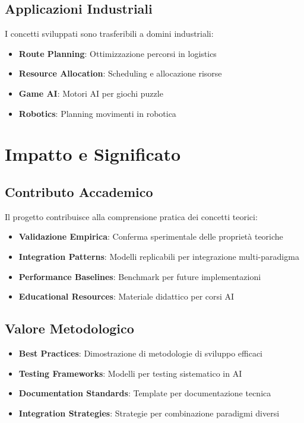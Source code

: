 \documentclass[12pt,a4paper]{report}
\theoremstyle{definition}
\begin{document}
\subsection{Applicazioni Industriali}

I concetti sviluppati sono trasferibili a domini industriali:

\begin{itemize}
    \item \textbf{Route Planning}: Ottimizzazione percorsi in logistics
    \item \textbf{Resource Allocation}: Scheduling e allocazione risorse
    \item \textbf{Game AI}: Motori AI per giochi puzzle
    \item \textbf{Robotics}: Planning movimenti in robotica
\end{itemize}

\section{Impatto e Significato}

\subsection{Contributo Accademico}

Il progetto contribuisce alla comprensione pratica dei concetti teorici:

\begin{itemize}
    \item \textbf{Validazione Empirica}: Conferma sperimentale delle proprietà teoriche
    \item \textbf{Integration Patterns}: Modelli replicabili per integrazione multi-paradigma
    \item \textbf{Performance Baselines}: Benchmark per future implementazioni
    \item \textbf{Educational Resources}: Materiale didattico per corsi AI
\end{itemize}

\subsection{Valore Metodologico}

\begin{itemize}
    \item \textbf{Best Practices}: Dimostrazione di metodologie di sviluppo efficaci
    \item \textbf{Testing Frameworks}: Modelli per testing sistematico in AI
    \item \textbf{Documentation Standards}: Template per documentazione tecnica
    \item \textbf{Integration Strategies}: Strategie per combinazione paradigmi diversi
\end{itemize}
\end{document}
